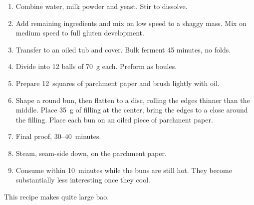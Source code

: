 
\begin{ingredients}
\end{ingredients}


\begin{recipe}
  \begin{enumerate}

  \item Combine water, milk powder and yeast.  Stir to dissolve.

  \item Add remaining ingredients and mix on low speed to a shaggy
    mass.  Mix on medium speed to full gluten development.

  \item Transfer to an oiled tub and cover.  Bulk ferment 45 minutes,
    no folds.

  \item Divide into 12 balls of 70~g each.  Preform as boules.

  \item Prepare 12~squares of parchment paper and brush lightly with
    oil.

  \item Shape a round bun, then flatten to a disc, rolling the edges
    thinner than the middle.  Place 35~g of filling at the center,
    bring the edges to a close around the filling.  Place each bun on
    an oiled piece of parchment paper.

  \item Final proof, 30--40~minutes.

  \item Steam, seam-side down, on the parchment paper.

  \item Consume within 10~minutes while the buns are still hot.  They
    become substantially less interesting once they cool.

  \end{enumerate}
\end{recipe}

\notes
This recipe makes quite large bao.


